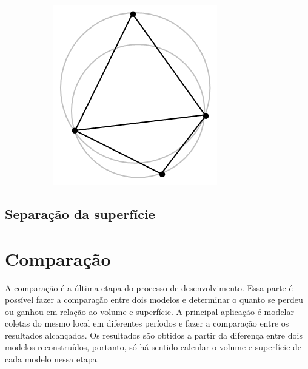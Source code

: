 \begin{figure}[H]
\begin{subfigure}[t]{0.27\textwidth}
        \caption{}
        \label{fig:delaunay_theorem2}
    \end{subfigure}
    \hspace{2em}
    \begin{subfigure}[t]{0.2\textwidth}
        \includegraphics[width=\textwidth]{dados/figuras/delaunay_theorem3.png}
        \caption{}
        \label{fig:delaunay_theorem3}
    \end{subfigure}
    \label{fig:delaunay_theorem}
\end{figure}

\subsection{Separação da superfície}



\section{Comparação}
\label{sec:comparacao}

A comparação é a última etapa do processo de desenvolvimento. 
Essa parte é possível fazer a comparação entre dois modelos e determinar o quanto se perdeu ou ganhou em relação ao volume e superfície. 
A principal aplicação é modelar coletas do mesmo local em diferentes períodos e fazer a comparação entre os resultados alcançados. 
Os resultados são obtidos a partir da diferença entre dois modelos reconstruídos, portanto, só há sentido calcular o volume e superfície de cada modelo nessa etapa.

